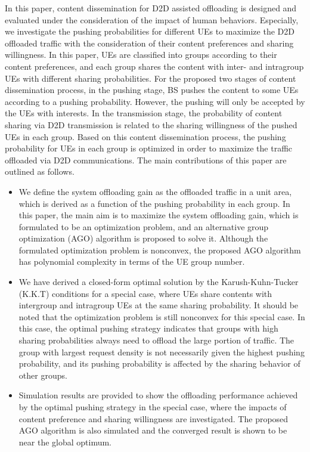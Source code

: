 \documentclass[12pt, draftclsnofoot, onecolumn]{IEEEtran}
\begin{document}
In this paper, content dissemination for D2D assisted offloading is designed and evaluated under the consideration of the impact of human behaviors. Especially, we investigate the pushing probabilities for different UEs to maximize the D2D offloaded traffic with the consideration of their content preferences and sharing willingness. In this paper, UEs are classified into groups according to their content preferences, and each group shares the content with inter- and intragroup UEs with different sharing probabilities. For the proposed two stages of content dissemination process, in the pushing stage, BS pushes the content to some UEs according to a pushing probability. However, the pushing will only be accepted by the UEs with interests. In the transmission stage, the probability of content sharing via D2D transmission is related to the sharing willingness of the pushed UEs in each group. Based on this content dissemination process, the pushing probability for UEs in each group is optimized in order to maximize the traffic offloaded via D2D communications. The main contributions of this paper are outlined as follows.
\begin{itemize}
\item  We define the system offloading gain as the offloaded traffic in a unit area, which is derived as a function of the pushing probability in each group. In this paper, the main aim is to maximize the system offloading gain, which is formulated to be an optimization problem, and an alternative group optimization (AGO) algorithm is proposed to solve it. Although the formulated optimization problem is nonconvex, the proposed AGO algorithm has polynomial complexity in terms of the UE group number.
\item We have derived a closed-form optimal solution by the Karush-Kuhn-Tucker (K.K.T) conditions for a special case, where UEs share contents with intergroup and intragroup UEs at the same sharing probability. It should be noted that the optimization problem is still nonconvex for this special case.
In this case, the optimal pushing strategy indicates that groups with high sharing probabilities always need to offload the large portion of traffic. The group with largest request density is not necessarily given the highest pushing probability, and its pushing probability is affected by the sharing behavior of other groups.
\item Simulation results are provided to show the offloading performance achieved by the optimal pushing strategy in the special case, where the impacts of content preference and sharing willingness are investigated. The proposed AGO algorithm is also simulated and the converged result is shown to be near the global optimum.
\end{itemize}
\end{document}
